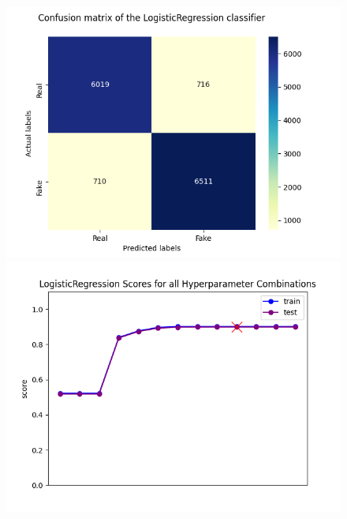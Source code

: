 \documentclass[10pt,twocolumn,letterpaper]{article}
\begin{document}
\begin{figure}[h]
   \begin{center}
        \includegraphics[width=\linewidth]{graphs/LR/confusion_matrix.png}
        \includegraphics[width=\linewidth]{graphs/LR/scores_plot.png}
   \end{center}
        \vspace*{-5mm}
        \caption{\label{first_figure}}
\end{figure}
\end{document}
